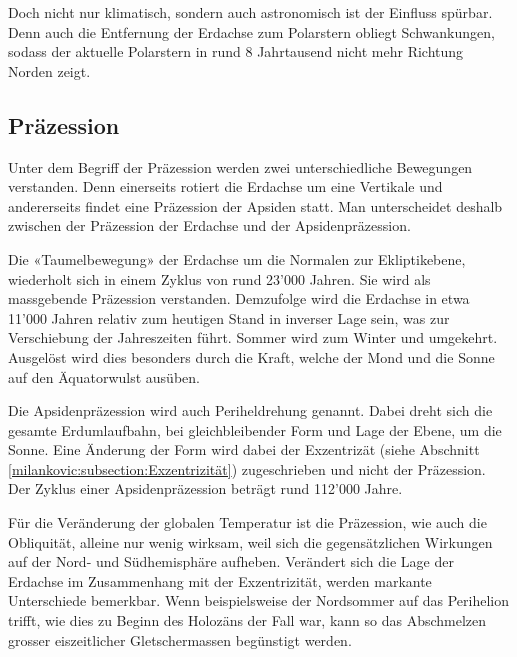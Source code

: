 Doch nicht nur klimatisch, sondern auch astronomisch ist der Einfluss spürbar.
Denn auch die Entfernung der Erdachse zum Polarstern obliegt Schwankungen, sodass der aktuelle Polarstern in rund 8 Jahrtausend nicht mehr Richtung Norden zeigt.
%

\subsection{Präzession
\label{milankovic:subsection:Präzession}}
Unter dem Begriff der Präzession werden zwei unterschiedliche Bewegungen verstanden.
%
Denn einerseits rotiert die Erdachse um eine Vertikale und andererseits findet eine Präzession der Apsiden statt.
%
Man unterscheidet deshalb zwischen der Präzession der Erdachse und der Apsidenpräzession.

Die «Taumelbewegung» der Erdachse um die Normalen zur Ekliptikebene,  wiederholt sich in einem Zyklus von rund 23'000 Jahren.
Sie wird als massgebende Präzession verstanden.
Demzufolge wird die Erdachse in etwa 11'000 Jahren relativ zum heutigen Stand in inverser Lage sein, was zur Verschiebung der Jahreszeiten führt.
Sommer wird zum Winter und umgekehrt.
Ausgelöst wird dies besonders durch die Kraft, welche der Mond und die Sonne auf den Äquatorwulst ausüben.

Die Apsidenpräzession wird auch Periheldrehung genannt.
Dabei dreht sich die gesamte Erdumlaufbahn, bei gleichbleibender Form und Lage der Ebene, um die Sonne. Eine Änderung der Form wird dabei der Exzentrizät
(siehe Abschnitt \ref{milankovic:subsection:Exzentrizität})
zugeschrieben und nicht der Präzession.
Der Zyklus einer Apsidenpräzession beträgt rund 112'000 Jahre.

Für die Veränderung der globalen Temperatur ist die Präzession, wie auch die Obliquität, alleine nur wenig wirksam, weil sich die gegensätzlichen Wirkungen auf der Nord- und Südhemisphäre aufheben.
Verändert sich die Lage der Erdachse im Zusammenhang mit der Exzentrizität, werden markante Unterschiede bemerkbar.
Wenn beispielsweise der Nordsommer auf das Perihelion trifft, wie dies zu Beginn des Holozäns der Fall war, kann so das Abschmelzen grosser eiszeitlicher Gletschermassen begünstigt werden.
%

